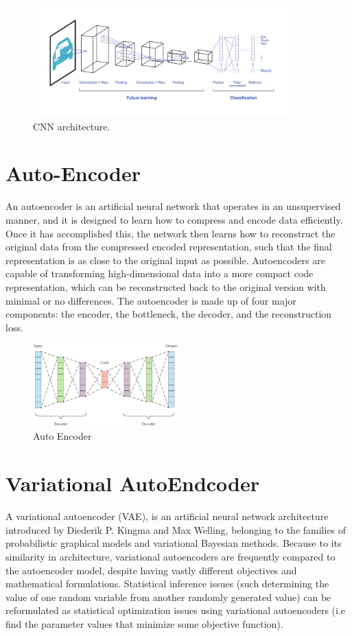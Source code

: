 \documentclass[12pt]{report}
\begin{document}
\begin{figure}[H]
\includegraphics[width=0.9\textwidth]{Images/cnn.pdf}
\caption{CNN architecture.}
\end{figure}


\section{Auto-Encoder}
An autoencoder is an artificial neural network that operates in an unsupervised manner, and it is designed to learn how to compress and encode data efficiently. Once it has accomplished this, the network then learns how to reconstruct the original data from the compressed encoded representation, such that the final representation is as close to the original input as possible. Autoencoders are capable of transforming high-dimensional data into a more compact code representation, which can be reconstructed back to the original version with minimal or no differences. The autoencoder is made up of four major components: the encoder, the bottleneck, the decoder, and the reconstruction loss.\\

\begin{figure}[H]
\centering
\includegraphics[width=0.5\textwidth]{Images/autoencoder.png}
\caption{Auto Encoder}
\end{figure}

\section{Variational AutoEndcoder}
A variational autoencoder (VAE), is an artificial neural network architecture introduced by Diederik P. Kingma and Max Welling, belonging to the families of probabilistic graphical models and variational Bayesian methods.
Because to its similarity in architecture, variational autoencoders are frequently compared to the autoencoder model, despite having vastly different objectives and mathematical formulations. Statistical inference issues (such determining the value of one random variable from another randomly generated value) can be reformulated as statistical optimization issues using variational autoencoders (i.e find the parameter values that minimize some objective function).
\end{document}

